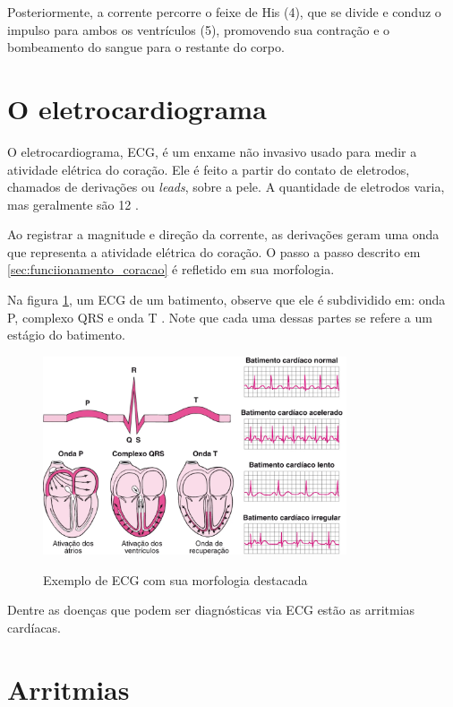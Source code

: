 Posteriormente, a corrente percorre o feixe de His (4), que se divide e conduz o impulso para ambos os ventrículos (5), promovendo sua contração e o bombeamento do sangue para o restante do corpo.

\section{O eletrocardiograma}
\label{sec:ecg}

O eletrocardiograma, ECG, é um enxame não invasivo usado para medir a atividade elétrica do coração. Ele é feito a partir do contato de eletrodos, chamados de derivações ou \textit{leads}, sobre a pele.
A quantidade de eletrodos varia, mas geralmente são 12 \cite{msd_ecg}.

Ao registrar a magnitude e direção da corrente, as derivações geram uma onda que representa a atividade elétrica do coração. O passo a passo descrito em \ref{sec:funciionamento_coracao} é refletido em sua morfologia.

Na figura \ref{fig:ecg_exemplo_coracao}, um  ECG de um batimento, observe que ele é subdividido em: onda P, complexo QRS e onda T \cite{msd_ecg}. Note que cada uma dessas partes se refere a um estágio do batimento.

\begin{figure}[H]
  \centering
  \caption{Exemplo de ECG com sua morfologia destacada}
   \includegraphics[width=0.8\textwidth]{figuras/ecg_exemplo_coracao.png} %
  \label{fig:ecg_exemplo_coracao}
\end{figure}

Dentre as doenças que podem ser diagnósticas via ECG estão as arritmias cardíacas. 

\section{Arritmias}


